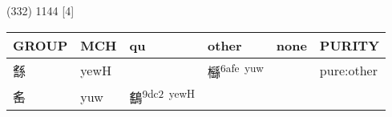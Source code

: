 \documentclass[14pt,a4paper]{scrartcl}
\begin{document}
(332) 1144 {[}4{]}

\begin{longtable}[c]{@{}llllll@{}}
\toprule
\begin{minipage}[b]{0.14\columnwidth}\raggedright\strut
GROUP
\strut\end{minipage} &
\begin{minipage}[b]{0.14\columnwidth}\raggedright\strut
MCH
\strut\end{minipage} &
\begin{minipage}[b]{0.14\columnwidth}\raggedright\strut
qu
\strut\end{minipage} &
\begin{minipage}[b]{0.14\columnwidth}\raggedright\strut
other
\strut\end{minipage} &
\begin{minipage}[b]{0.14\columnwidth}\raggedright\strut
none
\strut\end{minipage} &
\begin{minipage}[b]{0.14\columnwidth}\raggedright\strut
PURITY
\strut\end{minipage}\tabularnewline
\midrule
\endhead
\begin{minipage}[t]{0.14\columnwidth}\raggedright\strut
䌛
\strut\end{minipage} &
\begin{minipage}[t]{0.14\columnwidth}\raggedright\strut
yewH
\strut\end{minipage} &
\begin{minipage}[t]{0.14\columnwidth}\raggedright\strut
\strut\end{minipage} &
\begin{minipage}[t]{0.14\columnwidth}\raggedright\strut
櫾\textsuperscript{6afe~yuw}
\strut\end{minipage} &
\begin{minipage}[t]{0.14\columnwidth}\raggedright\strut
\strut\end{minipage} &
\begin{minipage}[t]{0.14\columnwidth}\raggedright\strut
pure:other
\strut\end{minipage}\tabularnewline
\begin{minipage}[t]{0.14\columnwidth}\raggedright\strut
䍃
\strut\end{minipage} &
\begin{minipage}[t]{0.14\columnwidth}\raggedright\strut
yuw
\strut\end{minipage} &
\begin{minipage}[t]{0.14\columnwidth}\raggedright\strut
鷂\textsuperscript{9dc2~yewH}

\end{minipage}
\end{longtable}
\end{document}
